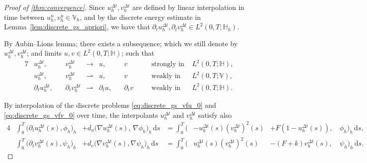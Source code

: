\documentclass[11pt, a4paper]{amsart}
\newcommand{\dd}{\,\mathrm{d}}
\newcommand{\HH}{\mathbb{H}}
\newcommand{\VV}{\mathbb{V}}
\numberwithin{equation}{section}
\begin{document}
	
	\begin{proof}[Proof of \cref{thm:convergence}]
		
		Since $	u_h^{\Delta t},	v_h^{\Delta t}$ are defined by linear interpolation in time between $u_h^n,v_h^n\in \VV_h$, and by the discrete energy estimate in Lemma~\ref{lem:discrete_gs_apriori}, we have that $\partial_t u_h^{\Delta t},\partial_t v_h^{\Delta t}\in L^2(0,T; \HH_h)$.
		
		By Aubin--Lions lemma; there exists a subsequence; which we still denote by $u_h^{\Delta t},v_h^{\Delta t}$; and limits $u,v\in L^2(0,T;\HH)$; such that
		\begin{alignat}{7}
			\label{eq:strong_L2}
			&u_h^{\Delta t}, &\, &v_h^{\Delta t}&\to{}& u, &\, &v &&\quad\mbox{strongly in } &L^2(0,T;\HH),
			\\
			\label{eq:weak_H1}
			&u_h^{\Delta t}, &\, &v_h^{\Delta t} &\rightharpoonup{}& u, &\,  &v &&\quad\mbox{weakly in } &L^2(0,T;\VV),
			\\
			\label{eq:weak_time}
			&\partial_t u_h^{\Delta t}, &\, &\partial_t v_h^{\Delta t} &\rightharpoonup{}& \partial_tu, &\,  &\partial_t v &&\quad\mbox{weakly in } &L^2(0,T; \HH).
		\end{alignat}
		
		By interpolation of the discrete problems \eqref{eq:discrete_gs_vfu_0} and \eqref{eq:discrete_gs_vfv_0} over time, the interpolants $u_h^{\Delta t}$ and $v_h^{\Delta t}$ satisfy also
		\begin{alignat*}{4}
			&\int_0^T\big(\partial_t u_h^{\Delta t}(s), \phi_h\big)_h &+  d_u \big(\nabla u_h^{\Delta t}(s),\,\nabla \phi_h\big)_h \dd s
			&{}= \int_0^T\big( &-u_h^{\Delta t}(s) (v_h^{\Delta t})^2(s) &+ F(1 - u_h^{\Delta t}(s)), \,&\phi_h \big)_h\dd s ,
			\\
			&\int_0^T\big(\partial_t v_h^{\Delta t}(s), \psi_h\big)_h &+ d_v\big(\nabla v_h^{\Delta t}(s),\nabla \psi_h\big)_h\dd s
			&{}= \int_0^T\big( &u_h^{\Delta t}(s) (v_h^{\Delta t})^2(s) &- (F+k)v_h^{\Delta t}(s),\, &\psi_h \big)_h\dd s .
		\end{alignat*}
		

\end{proof}
\end{document}
